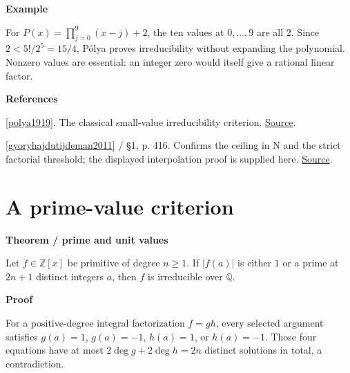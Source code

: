 \documentclass[11pt,a4paper,oneside,openany]{book}
\newenvironment{sources}{\par\smallskip\begingroup\footnotesize\color{atlasgray}\leftskip=10pt\setlength{\parskip}{2pt}}{\par\endgroup\smallskip}
\begin{document}
\begin{atlasblock}[standard]
\textbf{\sffamily Example}\par\smallskip
\color{black} For \(P(x)=\prod_{j=0}^{9}(x-j)+2\), the ten values at \(0,\ldots,9\) are all \(2\). Since \(2<5!/2^5=15/4\), Pólya proves irreducibility without expanding the polynomial. Nonzero values are essential: an integer zero would itself give a rational linear factor.\par
\end{atlasblock}\color{black}
\begin{sources}
\textbf{References}\par\smallskip
\noindent\hyperlink{ref:polya1919}{[polya1919]}. The classical small-value irreducibility criterion. \href{https://eudml.org/doc/145560}{Source}.\par
\noindent\hyperlink{ref:gyoryhajdutijdeman2011}{[gyoryhajdutijdeman2011]} / §1, p. 416. Confirms the ceiling in N and the strict factorial threshold; the displayed interpolation proof is supplied here. \href{https://link.springer.com/article/10.1007/s00605-010-0241-9}{Source}.\par
\end{sources}\color{black}
\section{A prime-value criterion}

\begin{atlasblock}[standard]
\textbf{\sffamily Theorem  /  prime and unit values}\par\smallskip
\color{black} Let \(f\in\mathbb Z[x]\) be primitive of degree \(n\ge1\). If \(|f(a)|\) is either \(1\) or a prime at \(2n+1\) distinct integers \(a\), then \(f\) is irreducible over \(\mathbb Q\).\par
\end{atlasblock}\color{black}


\begin{atlasblock}[standard]
\textbf{\sffamily Proof}\par\smallskip
\color{black} For a positive-degree integral factorization \(f=gh\), every selected argument satisfies \(g(a)=1\), \(g(a)=-1\), \(h(a)=1\), or \(h(a)=-1\). Those four equations have at most \(2\deg g+2\deg h=2n\) distinct solutions in total, a contradiction.\par
\end{atlasblock}\color{black}
\end{document}
